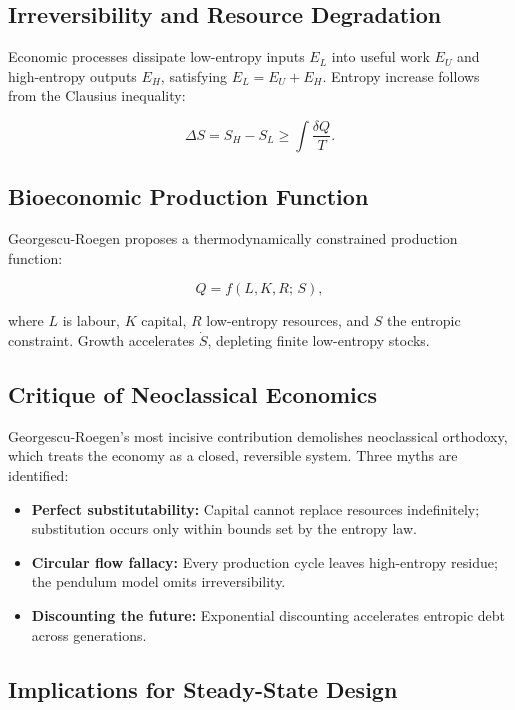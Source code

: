 \documentclass[12pt,a4paper]{article}
\theoremstyle{definition}
\begin{document}
\subsection{Irreversibility and Resource Degradation}

Economic processes dissipate low-entropy inputs $E_L$ into useful work $E_U$
and high-entropy outputs $E_H$, satisfying $E_L = E_U + E_H$.  Entropy
increase follows from the Clausius inequality:

\begin{equation}
  \Delta S = S_H - S_L \geq \int \frac{\delta Q}{T}.
\end{equation}

\subsection{Bioeconomic Production Function}

Georgescu-Roegen proposes a thermodynamically constrained production function:

\begin{equation}
  Q = f(L, K, R;\, S),
\end{equation}

where $L$ is labour, $K$ capital, $R$ low-entropy resources, and $S$ the
entropic constraint.  Growth accelerates $\dot{S}$, depleting finite
low-entropy stocks.

\subsection{Critique of Neoclassical Economics}

Georgescu-Roegen's most incisive contribution demolishes neoclassical
orthodoxy, which treats the economy as a closed, reversible system.  Three
myths are identified:

\begin{itemize}[leftmargin=*]
  \item \textbf{Perfect substitutability:} Capital cannot replace resources
    indefinitely; substitution occurs only within bounds set by the entropy law.
  \item \textbf{Circular flow fallacy:} Every production cycle leaves
    high-entropy residue; the pendulum model omits irreversibility.
  \item \textbf{Discounting the future:} Exponential discounting accelerates
    entropic debt across generations.
\end{itemize}

\subsection{Implications for Steady-State Design}
\end{document}
